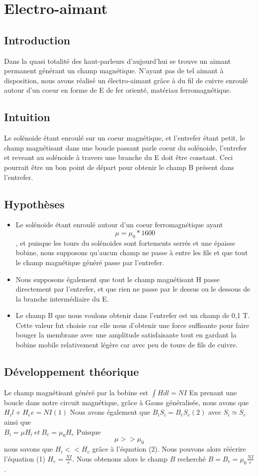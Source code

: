 \chapter{Electro-aimant}


\section{Introduction}
Dans la quasi totalité des haut-parleurs d'aujourd'hui se trouve un aimant permanent générant un champ magnétique.
N'ayant pas de tel aimant à disposition, nous avons réalisé un électro-aimant grâce à du fil de cuivre enroulé autour 
d'un coeur en forme de E de fer orienté, matériau ferromagnétique.
\section{Intuition}
Le solénoide étant enroulé sur un coeur magnétique, et l'entrefer étant petit, le champ magnétisant dans 
une boucle passant parle coeur du solénoide, l'entrefer et reveant au solénoide à travers une branche 
du E doit être constant. Ceci pourrait être un bon point de départ pour obtenir le champ B présent dans l'entrefer.
\section{Hypothèses}
\begin{itemize}
\item Le solénoide étant enroulé autour d'un coeur ferromagnétique ayant \[\mu = \mu_0 * 1600\], et puisque les 
tours du solénoides sont fortements serrés et une épaisse bobine, nous supposons qu'aucun champ ne passe 
à entre les fils et que tout le champ magnétique généré passe par l'entrefer.\\
\item Nous supposons également que tout le champ magnétisant H passe directement par l'entrefer, et que rien ne passe par 
le dessus ou le dessous de la branche intermédiaire du E.
\item Le champ B que nous voulons obtenir dans l'entrefer est un champ de 0,1 T. Cette valeur fut choisie car elle nous 
d'obtenir une force suffisante pour faire bouger la membrane avec une amplitude satisfaisante tout en gardant la bobine 
mobile relativement légère car avec peu de tours de fils de cuivre.
\end{itemize}
\section{Développement théorique}
Le champ magnétisant généré par la bobine est 
$\int{H dl} = N I$
En prenant une boucle dans notre circuit magnétique, grâce à Gauss généralisée, nous avons que
$H_i l + H_e e = N I (1)$
Nous avons également que $B_i S_i = B_e S_e (2)$  avec $S_i \simeq S_e$
ainsi que \\
$B_i = \mu H_i \:et\:  B_e = \mu_0 H_e$
Puisque \[\mu >> \mu_0\]nous savons que $H_i << H_e$ grâce à l'équation (2).
Nous pouvons alors réécrire l'équation (1) $H_e = \frac{N I}{e}$.
Nous obtenons alors le champ $B$ recherché $B = B_e = \mu_0 \frac{N I}{e}$.
